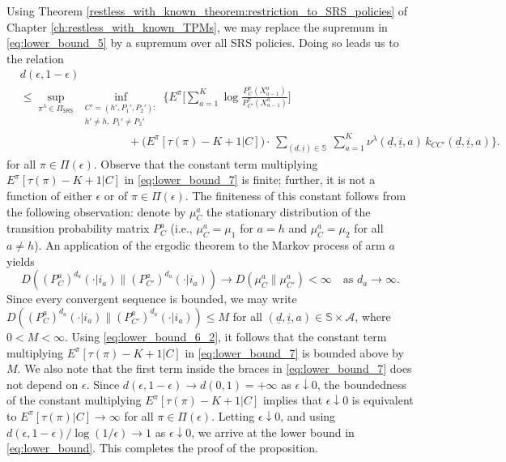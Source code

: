 Using Theorem \ref{restless_with_known_theorem:restriction_to_SRS_policies} of Chapter \ref{ch:restless_with_known_TPMs}, we may replace the supremum in \eqref{eq:lower_bound_5} by a supremum over all SRS policies. Doing so leads us to the relation
\begin{align}
	& d(\epsilon,1-\epsilon)\nonumber\\
	&\leq \sup\limits_{\pi^\lambda\in \Pi_{\textsf{SRS}}}\,\inf\limits_{\substack{C'=(h', P_1', P_2'):\\h'\neq h, ~P_1'\neq P_2'}} \bigg\lbrace E^\pi\bigg[\sum\limits_{a=1}^{K} \log\frac{P^\pi_C(X_{a-1}^a)}{P^\pi_{C'}(X_{a-1}^a)}\bigg]\nonumber\\
	&\hspace{4cm}+\bigg(E^\pi[\tau(\pi)-K+1|C]\bigg)\cdot\,\sum\limits_{(\underline{d},\underline{i})\in\mathbb{S}}~\sum\limits_{a=1}^{K}\nu^\lambda(\underline{d},\underline{i},a)\, k_{CC'}(\underline{d}, \underline{i}, a)\bigg\rbrace.\label{eq:lower_bound_7}
\end{align}
for all $\pi\in\Pi(\epsilon)$. Observe that the constant term multiplying $E^\pi[\tau(\pi)-K+1|C]$ in \eqref{eq:lower_bound_7} is finite; further, it is not a function of either $\epsilon$ or of $\pi\in\Pi(\epsilon)$. The finiteness of this constant follows from the following observation: denote by $\mu_C^a$ the stationary distribution of the transition probability matrix $P_C^a$ (i.e., $\mu_C^a=\mu_1$ for $a=h$ and $\mu_C^a=\mu_2$ for all $a\neq h$). An application of the ergodic theorem to the Markov process of arm $a$ yields
\begin{equation}
	D((P_C^a)^{d_a}(\cdot|i_a)\|(P_{C'}^a)^{d_a}(\cdot|i_a))\longrightarrow D(\mu_C^a\|\mu_{C'}^a)<\infty \quad \text{as }d_a\to\infty.
\end{equation}
Since every convergent sequence is bounded, we may write $D((P_C^a)^{d_a}(\cdot|i_a)\|(P_{C'}^a)^{d_a}(\cdot|i_a))\leq M$ for all $(\underline{d},\underline{i},a)\in\mathbb{S}\times\mathcal{A}$, where $0<M<\infty$. Using \eqref{eq:lower_bound_6_2}, it follows that the constant term multiplying $E^\pi[\tau(\pi)-K+1|C]$ in \eqref{eq:lower_bound_7} is bounded above by $M$. We also note that the first term inside the braces in \eqref{eq:lower_bound_7} does not depend on $\epsilon$. Since $d(\epsilon,1-\epsilon)\to d(0,1)=+\infty$ as $\epsilon\downarrow 0$, the boundedness of the constant multiplying $E^\pi[\tau(\pi)-K+1|C]$ implies that $\epsilon\downarrow 0$ is equivalent to $E^\pi[\tau(\pi)|C]\to \infty$ for all $\pi\in\Pi(\epsilon)$.
Letting $\epsilon\downarrow 0$, and using  $d(\epsilon,1-\epsilon)/\log(1/\epsilon)\longrightarrow 1$ as $\epsilon\downarrow 0$, we arrive at the lower bound in \eqref{eq:lower_bound}. This completes the proof of the proposition.

